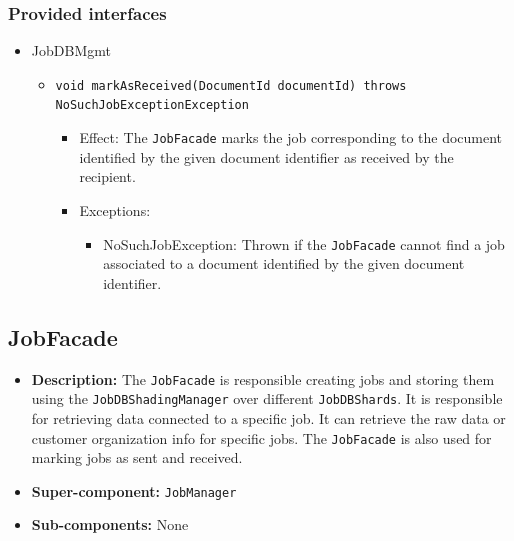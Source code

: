 \documentclass[a4paper,10pt]{article}
\begin{document}
\subsubsection*{Provided interfaces}
\begin{itemize}
    \item JobDBMgmt
    \begin{itemize}
     	\item \texttt{void markAsReceived(DocumentId documentId) throws NoSuchJobExceptionException}
    	\begin{itemize}
    		\item Effect: The \texttt{JobFacade} marks the job corresponding to the document identified by the given document identifier as received by the recipient.
    		\item Exceptions:
    		\begin{itemize}
    			\item NoSuchJobException: Thrown if the \texttt{JobFacade} cannot find a job associated to a document identified by the given document identifier.
    		\end{itemize}
    	\end{itemize}
    \end{itemize}
\end{itemize}


\subsection{JobFacade}
\begin{itemize}
    \item \textbf{Description:} The \texttt{JobFacade} is responsible creating jobs and storing them using the \texttt{JobDBShadingManager} over different \texttt{JobDBShards}. It is responsible for retrieving data connected to a specific job. It can retrieve the raw data or customer organization info for specific jobs. The \texttt{JobFacade} is also used for marking jobs as sent and received.
    \item \textbf{Super-component:} \texttt{JobManager}
    \item \textbf{Sub-components:} None
\end{itemize}
\end{document}
